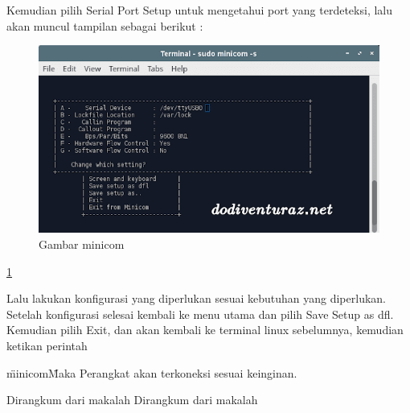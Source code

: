 	Kemudian pilih Serial Port Setup untuk mengetahui port yang terdeteksi, lalu akan muncul tampilan sebagai berikut :
	
	\begin{figure} [ht]
	\centerline{\includegraphics[width=1\textwidth]{figures/minicom.png}}
	\caption{Gambar minicom}
	\label{minicom}
	\end{figure}
	
	\ref{minicom}
	
	Lalu lakukan konfigurasi yang diperlukan sesuai kebutuhan yang diperlukan. Setelah konfigurasi selesai kembali ke menu utama dan pilih Save Setup as dfl. Kemudian pilih Exit, dan akan kembali ke terminal linux sebelumnya, kemudian ketikan perintah 
	
	\"minicom\"
	Maka Perangkat akan terkoneksi sesuai keinginan.

Dirangkum dari makalah \cite{fasnacht2008serial}
Dirangkum dari makalah \cite{barabanov1997linux}	


